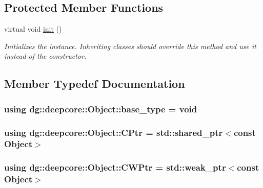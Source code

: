\subsection*{Protected Member Functions}
\begin{DoxyCompactItemize}
\item 
virtual void \hyperlink{classdg_1_1deepcore_1_1_object_a0982aef61087daaf910acfe8b6dcac99}{init} ()
\begin{DoxyCompactList}\small\item\em Initializes the instance. Inheriting classes should override this method and use it instead of the constructor. \end{DoxyCompactList}\end{DoxyCompactItemize}


\subsection{Member Typedef Documentation}
\subsubsection[{\texorpdfstring{base\+\_\+type}{base_type}}]{\setlength{\rightskip}{0pt plus 5cm}using {\bf dg\+::deepcore\+::\+Object\+::base\+\_\+type} =  void}\hypertarget{classdg_1_1deepcore_1_1_object_acffbbe34053468dfb48debd8481a804d}{}\label{classdg_1_1deepcore_1_1_object_acffbbe34053468dfb48debd8481a804d}
\subsubsection[{\texorpdfstring{C\+Ptr}{CPtr}}]{\setlength{\rightskip}{0pt plus 5cm}using {\bf dg\+::deepcore\+::\+Object\+::\+C\+Ptr} =  std\+::shared\+\_\+ptr$<$const {\bf Object}$>$}\hypertarget{classdg_1_1deepcore_1_1_object_a9929d3554639c9ed70d26aa8ede60cca}{}\label{classdg_1_1deepcore_1_1_object_a9929d3554639c9ed70d26aa8ede60cca}
\subsubsection[{\texorpdfstring{C\+W\+Ptr}{CWPtr}}]{\setlength{\rightskip}{0pt plus 5cm}using {\bf dg\+::deepcore\+::\+Object\+::\+C\+W\+Ptr} =  std\+::weak\+\_\+ptr$<$const {\bf Object}$>$}\hypertarget{classdg_1_1deepcore_1_1_object_adc394d82cc6a5fb85e7d65fc065d867f}{}\label{classdg_1_1deepcore_1_1_object_adc394d82cc6a5fb85e7d65fc065d867f}
